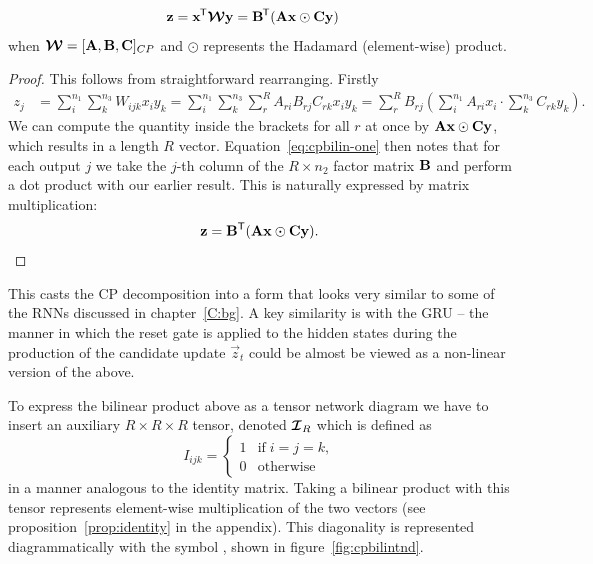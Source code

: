 \begin{prop} \label{prop:cpbilin}
\begin{align}
	\mathbf{z} &= \mathbf{x}^{\mkern-1.5mu\mathsf{T}}\bm{\mathcal{W}}\mathbf{y} 
			= \mathbf{B}^{\mkern-1.5mu\mathsf{T}}(\mathbf{A}\mathbf{x} \odot \mathbf{C}\mathbf{y})
\end{align}
when \(\bm{\mathcal{W}} = [\mathbf{A}, \mathbf{B}, \mathbf{C}]_{CP}\) and \(\odot\) represents the Hadamard
(element-wise) product.
\end{prop}
\begin{proof}
This follows from straightforward rearranging. Firstly
\begin{align}\label{eq:cpbilin-one}
	z_j &= \sum_{i}^{n_1} \sum_k^{n_3} W_{ijk} x_i y_k 
		= \sum_{i}^{n_1} \sum_k^{n_3} \sum_r^R A_{ri} B_{rj} C_{rk} x_i y_k
		= \sum_r^R B_{rj} \left( \sum_i^{n_1} A_{ri} x_i \cdot \sum_k^{n_3} C_{rk}y_k \right).
\end{align}
We can compute the quantity inside the brackets for all \(r\) at once
by \(\mathbf{A}\mathbf{x} \odot \mathbf{C}\mathbf{y}\), which results in a length \(R\) vector. 
Equation~\eqref{eq:cpbilin-one} then notes that for each output \(j\) we take the \(j\)-th column
of the \(R \times n_2\) factor matrix \(\mathbf{B}\) and perform a dot product with our earlier
result. This is naturally expressed by matrix multiplication:
\begin{equation}
	\mathbf{z} = \mathbf{B}^\mathsf{T} (\mathbf{A}\mathbf{x} \odot \mathbf{C}\mathbf{y}).
\end{equation}
\end{proof}

This casts the CP decomposition into a form that looks very similar to some of the
RNNs discussed in chapter~\ref{C:bg}. A key similarity is with the GRU -- the manner in which
the reset gate is applied to the hidden states during the production of the candidate update
\(\vec{z}_t\) could be almost be viewed as a non-linear version of the above.

To express the bilinear product above as a tensor network diagram  we have to insert
an auxiliary \(R\times R\times R\) tensor, denoted \(\bm{\mathcal{I}}_{R}\) which is defined as
\begin{equation}\label{eq:tensoridentity}
	I_{ijk} = \begin{cases}
		1 & \mathrm{if} \; i=j=k, \\
		0 & \mathrm{otherwise}
	\end{cases}
\end{equation} in a manner analogous to the identity matrix. Taking a bilinear product with this
tensor represents element-wise multiplication of the two vectors (see proposition~\ref{prop:identity}
in the appendix). This diagonality is
represented diagrammatically with the symbol
,
shown in 
figure~\ref{fig:cpbilintnd}.

